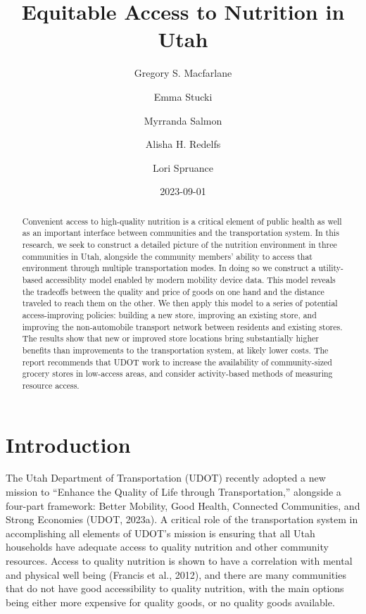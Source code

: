 \documentclass[
  letterpaper,
  DIV=11,
  numbers=noendperiod]{scrreport}
\title{Equitable Access to Nutrition in Utah}
\author{Gregory S. Macfarlane \and Emma Stucki \and Myrranda
Salmon \and Alisha H. Redelfs \and Lori Spruance}
\date{2023-09-01}
\renewcommand*\contentsname{Table of contents}
\newcommand\contentsname{Table of contents}
\begin{document}
\maketitle
\begin{abstract}
Convenient access to high-quality nutrition is a critical element of
public health as well as an important interface between communities and
the transportation system. In this research, we seek to construct a
detailed picture of the nutrition environment in three communities in
Utah, alongside the community members' ability to access that
environment through multiple transportation modes. In doing so we
construct a utility-based accessiblity model enabled by modern mobility
device data. This model reveals the tradeoffs between the quality and
price of goods on one hand and the distance traveled to reach them on
the other. We then apply this model to a series of potential
access-improving policies: building a new store, improving an existing
store, and improving the non-automobile transport network between
residents and existing stores. The results show that new or improved
store locations bring substantially higher benefits than improvements to
the transportation system, at likely lower costs. The report recommends
that UDOT work to increase the availability of community-sized grocery
stores in low-access areas, and consider activity-based methods of
measuring resource access.
\end{abstract}
\ifdefined\Shaded\renewenvironment{Shaded}{\begin{tcolorbox}[breakable, borderline west={3pt}{0pt}{shadecolor}, boxrule=0pt, enhanced, frame hidden, interior hidden, sharp corners]}{\end{tcolorbox}}\fi

\renewcommand*\contentsname{Table of contents}
{
\hypersetup{linkcolor=}
\setcounter{tocdepth}{2}
\tableofcontents
}

\hypertarget{introduction}{%
\chapter{Introduction}\label{introduction}}

The Utah Department of Transportation (UDOT) recently adopted a new
mission to ``Enhance the Quality of Life through Transportation,''
alongside a four-part framework: Better Mobility, Good Health, Connected
Communities, and Strong Economies (UDOT, 2023a). A critical role of the
transportation system in accomplishing all elements of UDOT's mission is
ensuring that all Utah households have adequate access to quality
nutrition and other community resources. Access to quality nutrition is
shown to have a correlation with mental and physical well being (Francis
et al., 2012), and there are many communities that do not have good
accessibility to quality nutrition, with the main options being either
more expensive for quality goods, or no quality goods available.
\end{document}
